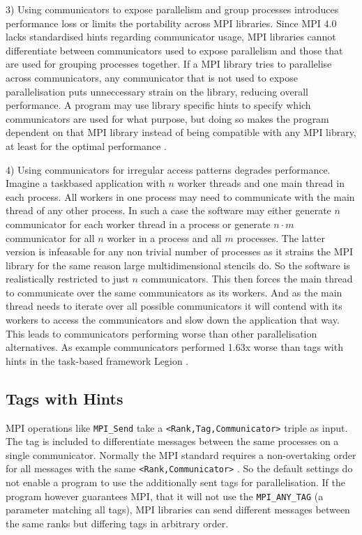 \documentclass[sigconf]{acmart}
\begin{document}
3) Using communicators to expose parallelism and group processes introduces performance loss or limits the portability across MPI libraries.
Since MPI 4.0 lacks standardised hints regarding communicator usage, MPI libraries cannot differentiate between communicators used to expose parallelism and those that are used for grouping processes together.
If a MPI library tries to parallelise across communicators, any communicator that is not used to expose parallelisation puts unneccessary strain on the library, reducing overall performance.
A program may use library specific hints to specify which communicators are used for what purpose, but doing so makes the program dependent on that MPI library instead of being compatible with any MPI library, at least for the optimal performance \cite{zambreLessonsLearned2022}.

4) Using communicators for irregular access patterns degrades performance.
Imagine a taskbased application with $n$ worker threads and one main thread in each process.
All workers in one process may need to communicate with the main thread of any other process.
In such a case the software may either generate $n$ communicator for each worker thread in a process or generate $n \cdot m$ communicator for all $n$ worker in a process and all $m$ processes.
The latter version is infeasable for any non trivial number of processes as it strains the MPI library for the same reason large multidimensional stencils do.
So the software is realistically restricted to just $n$ communicators.
This then forces the main thread to communicate over the same communicators as its workers.
And as the main thread needs to iterate over all possible communicators it will contend with its workers to access the communicators and slow down the application that way.
This leads to communicators performing worse than other parallelisation alternatives.
As example communicators performed 1.63x worse than tags with hints in the task-based framework Legion \cite{zambreLogicalParallel2021}.

\subsection{Tags with Hints}

MPI operations like \verb|MPI_Send| take a \verb|<Rank,Tag,Communicator>| triple as input.
The tag is included to differentiate messages between the same processes on a single communicator.
Normally the MPI standard requires a non-overtaking order for all messages with the same \verb|<Rank,Communicator>| \cite{mpi40}.
So the default settings do not enable a program to use the additionally sent tags for parallelisation.
If the program however guarantees MPI, that it will not use the \verb|MPI_ANY_TAG| (a parameter matching all tags), MPI libraries can send different messages between the same ranks but differing tags in arbitrary order.
\end{document}
